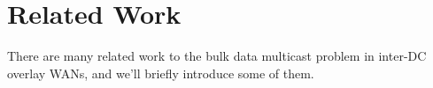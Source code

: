 \section{Related Work}



There are many related work to the bulk data multicast problem in inter-DC overlay WANs, and we'll briefly introduce some of them.

